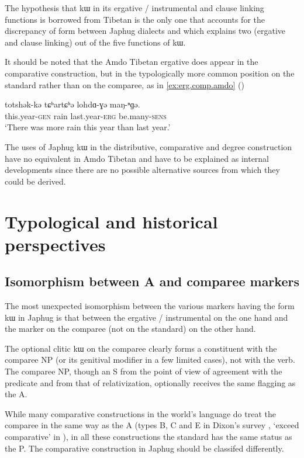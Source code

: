 \documentclass[oldfontcommands,oneside,a4paper,11pt]{article}
\newcommand{\ipa}[1]{{\phon #1}} %
\begin{document}
The hypothesis that \ipa{kɯ} in its ergative / instrumental and clause linking functions is borrowed from Tibetan is the only one that accounts for the discrepancy of form between Japhug  dialects and which explains two (ergative and clause linking) out of the five functions of \ipa{kɯ}.

It should be noted that the Amdo Tibetan  ergative does appear in the comparative construction, but in the typologically more common position on the standard rather than on the comparee, as in \ref{ex:erg.comp.amdo}  (\citealt[239]{vbrugmo03maqu})

 \begin{exe} 
\ex \label{ex:erg.comp.amdo}
\gll 
\ipa{totshək-kə}  	\ipa{tɕʰartɕʰə}  	\ipa{lohdɑ-ɣə}  	\ipa{maŋ-ⁿɡə.}  \\
this.year-\textsc{gen} rain last.year-\textsc{erg} be.many-\textsc{sens} \\
 \glt   `There was more rain this year than last year.'
\end{exe}  

The uses of Japhug \ipa{kɯ} in the distributive, comparative and degree construction have no equivalent in Amdo Tibetan and have to be explained as internal developments since there are no  possible alternative sources from which they could be derived.

\section{Typological and historical perspectives} \label{sec:historical}

\subsection{Isomorphism between A and comparee markers}
The most unexpected isomorphism between the various markers having the form \ipa{kɯ} in Japhug is that between the ergative / instrumental on the one hand and the marker on the comparee (not on the standard) on the other hand.   

The optional clitic \ipa{kɯ} on the comparee  clearly forms a constituent with the comparee NP (or its genitival modifier in a few limited cases), not with the verb. The comparee NP, though an S from the point of view of agreement with the predicate and from that of relativization, optionally receives  the same flagging as the A.

 
While many comparative constructions in the world's language do treat the comparee in the same way as the A (types B, C and E in Dixon's survey \citeyearpar[789]{dixon08comparative}, `exceed comparative' in  \citealt{stassen11comparative}), in all these constructions the standard has the same status as the P.  The comparative construction in Japhug should be classifed differently. 
\end{document}

